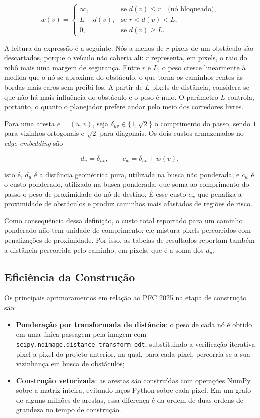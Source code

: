 \documentclass[
    12pt,
    openright,
    oneside,
    a4paper,
    english,
    brazil
]{abntex2}
\begin{document}
\[
w(v) =
\begin{cases}
\infty, & \text{se } d(v) \leq r \quad \text{(nó bloqueado)},\\[0.3em]
L - d(v), & \text{se } r < d(v) < L,\\[0.3em]
0, & \text{se } d(v) \geq L.
\end{cases}
\]

A leitura da expressão é a seguinte. Nós a menos de $r$ pixels de um obstáculo são descartados, porque o veículo não caberia ali: $r$ representa, em pixels, o raio do robô mais uma margem de segurança. Entre $r$ e $L$, o peso cresce linearmente à medida que o nó se aproxima do obstáculo, o que torna os caminhos rentes às bordas mais caros sem proibi-los. A partir de $L$ pixels de distância, considera-se que não há mais influência do obstáculo e o peso é nulo. O parâmetro $L$ controla, portanto, o quanto o planejador prefere andar pelo meio dos corredores livres.

Para uma aresta $e = (u, v)$, seja $\delta_{uv} \in \{1, \sqrt{2}\}$ o comprimento do passo, sendo $1$ para vizinhos ortogonais e $\sqrt{2}$ para diagonais. Os dois custos armazenados no \textit{edge embedding} são

\[
d_u = \delta_{uv}, \qquad c_w = \delta_{uv} + w(v),
\]

isto é, $d_u$ é a distância geométrica pura, utilizada na busca não ponderada, e $c_w$ é o custo ponderado, utilizado na busca ponderada, que soma ao comprimento do passo o peso de proximidade do nó de destino. É esse custo $c_w$ que penaliza a proximidade de obstáculos e produz caminhos mais afastados de regiões de risco.

Como consequência dessa definição, o custo total reportado para um caminho ponderado não tem unidade de comprimento: ele mistura pixels percorridos com penalizações de proximidade. Por isso, as tabelas de resultados reportam também a distância percorrida pelo caminho, em pixels, que é a soma dos $d_u$.

\subsection{Eficiência da Construção}

Os principais aprimoramentos em relação ao PFC 2025 \cite{camelo2025} na etapa de construção são:

\begin{itemize}
    \item \textbf{Ponderação por transformada de distância}: o peso de cada nó é obtido em uma única passagem pela imagem com \texttt{scipy.ndimage.distance\_transform\_edt}, substituindo a verificação iterativa pixel a pixel do projeto anterior, na qual, para cada pixel, percorria-se a sua vizinhança em busca de obstáculos;
    \item \textbf{Construção vetorizada}: as arestas são construídas com operações NumPy sobre a matriz inteira, evitando laços Python sobre cada pixel. Em um grafo de alguns milhões de arestas, essa diferença é da ordem de duas ordens de grandeza no tempo de construção.
\end{itemize}
\end{document}
